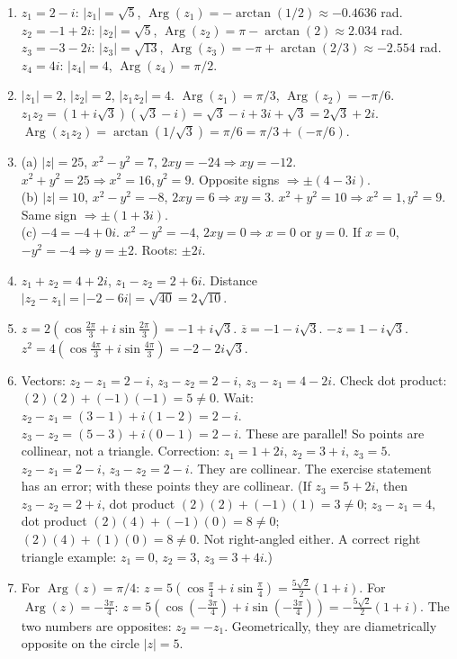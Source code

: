 \documentclass[11pt]{article}
\begin{document}
\begin{corrige}[Exercise 1]
\begin{enumerate}
    \item $z_1=2-i$: $|z_1|=\sqrt{5}$, $\operatorname{Arg}(z_1)=-\arctan(1/2) \approx -0.4636$ rad.\\
          $z_2=-1+2i$: $|z_2|=\sqrt{5}$, $\operatorname{Arg}(z_2)=\pi-\arctan(2) \approx 2.034$ rad.\\
          $z_3=-3-2i$: $|z_3|=\sqrt{13}$, $\operatorname{Arg}(z_3)=-\pi+\arctan(2/3) \approx -2.554$ rad.\\
          $z_4=4i$: $|z_4|=4$, $\operatorname{Arg}(z_4)=\pi/2$.
    \item $|z_1|=2$, $|z_2|=2$, $|z_1z_2|=4$.  $\operatorname{Arg}(z_1)=\pi/3$, $\operatorname{Arg}(z_2)=-\pi/6$.  $z_1z_2 = (1+i\sqrt{3})(\sqrt{3}-i) = \sqrt{3}-i+3i+\sqrt{3} = 2\sqrt{3}+2i$.  $\operatorname{Arg}(z_1z_2)=\arctan(1/\sqrt{3})=\pi/6 = \pi/3 + (-\pi/6)$.
    \item (a) $|z|=25$, $x^2-y^2=7$, $2xy=-24 \Rightarrow xy=-12$.  $x^2+y^2=25 \Rightarrow x^2=16, y^2=9$.  Opposite signs $\Rightarrow \pm(4-3i)$.\\
          (b) $|z|=10$, $x^2-y^2=-8$, $2xy=6 \Rightarrow xy=3$.  $x^2+y^2=10 \Rightarrow x^2=1, y^2=9$.  Same sign $\Rightarrow \pm(1+3i)$.\\
          (c) $-4 = -4+0i$.  $x^2-y^2=-4$, $2xy=0 \Rightarrow x=0$ or $y=0$.  If $x=0$, $-y^2=-4 \Rightarrow y=\pm2$.  Roots: $\pm 2i$.
    \item $z_1+z_2=4+2i$, $z_1-z_2=2+6i$.  Distance $|z_2-z_1| = |-2-6i| = \sqrt{40}=2\sqrt{10}$.
    \item $z = 2(\cos\frac{2\pi}{3}+i\sin\frac{2\pi}{3}) = -1+i\sqrt{3}$.  $\overline{z} = -1-i\sqrt{3}$.  $-z = 1-i\sqrt{3}$.  $z^2 = 4(\cos\frac{4\pi}{3}+i\sin\frac{4\pi}{3}) = -2-2i\sqrt{3}$.
    \item Vectors: $z_2-z_1 = 2-i$, $z_3-z_2 = 2-i$, $z_3-z_1 = 4-2i$.  Check dot product: $(2)(2) + (-1)(-1) = 5 \neq 0$.  Wait: $z_2-z_1 = (3-1)+i(1-2) = 2-i$. $z_3-z_2 = (5-3)+i(0-1) = 2-i$. These are parallel! So points are collinear, not a triangle.  Correction: $z_1=1+2i$, $z_2=3+i$, $z_3=5$.  $z_2-z_1=2-i$, $z_3-z_2=2-i$. They are collinear.  The exercise statement has an error; with these points they are collinear.  (If $z_3=5+2i$, then $z_3-z_2=2+i$, dot product $(2)(2)+(-1)(1)=3\neq0$; $z_3-z_1=4$, dot product $(2)(4)+(-1)(0)=8\neq0$; $(2)(4)+(1)(0)=8\neq0$.  Not right-angled either.  A correct right triangle example: $z_1=0$, $z_2=3$, $z_3=3+4i$.)
    \item For $\operatorname{Arg}(z)=\pi/4$: $z = 5(\cos\frac{\pi}{4}+i\sin\frac{\pi}{4}) = \frac{5\sqrt{2}}{2}(1+i)$.  For $\operatorname{Arg}(z)=-\frac{3\pi}{4}$: $z = 5(\cos(-\frac{3\pi}{4})+i\sin(-\frac{3\pi}{4})) = -\frac{5\sqrt{2}}{2}(1+i)$.  The two numbers are opposites: $z_2 = -z_1$.  Geometrically, they are diametrically opposite on the circle $|z|=5$.
\end{enumerate}
\end{corrige}
\end{document}
